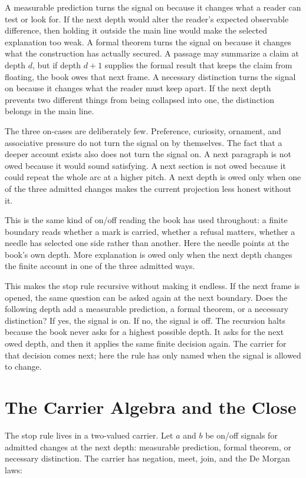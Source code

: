 A measurable prediction turns the signal on because it changes what a reader
can test or look for. If the next depth would alter the reader's expected
observable difference, then holding it outside the main line would make the
selected explanation too weak. A formal theorem turns the signal on because it
changes what the construction has actually secured. A passage may summarize a
claim at depth \(d\), but if depth \(d+1\) supplies the formal result that keeps
the claim from floating, the book owes that next frame. A necessary distinction
turns the signal on because it changes what the reader must keep apart. If the
next depth prevents two different things from being collapsed into one, the
distinction belongs in the main line.

The three on-cases are deliberately few. Preference, curiosity, ornament, and
associative pressure do not turn the signal on by themselves. The fact that a
deeper account exists also does not turn the signal on. A next paragraph is not
owed because it would sound satisfying. A next section is not owed because it
could repeat the whole arc at a higher pitch. A next depth is owed only when one
of the three admitted changes makes the current projection less honest without
it.

This is the same kind of on/off reading the book has used throughout: a finite
boundary reads whether a mark is carried, whether a refusal matters, whether a
needle has selected one side rather than another. Here the needle points at the
book's own depth. More explanation is owed only when the next depth changes the
finite account in one of the three admitted ways.

This makes the stop rule recursive without making it endless. If the next frame
is opened, the same question can be asked again at the next boundary. Does the
following depth add a measurable prediction, a formal theorem, or a necessary
distinction? If yes, the signal is on. If no, the signal is off. The recursion
halts because the book never asks for a highest possible depth. It asks for the
next owed depth, and then it applies the same finite decision again. The carrier
for that decision comes next; here the rule has only named when the signal is
allowed to change.

\section{The Carrier Algebra and the Close}

The stop rule lives in a two-valued carrier. Let \(a\) and \(b\) be on/off
signals for admitted changes at the next depth: measurable prediction, formal
theorem, or necessary distinction. The carrier has negation, meet, join, and
the De Morgan laws:

